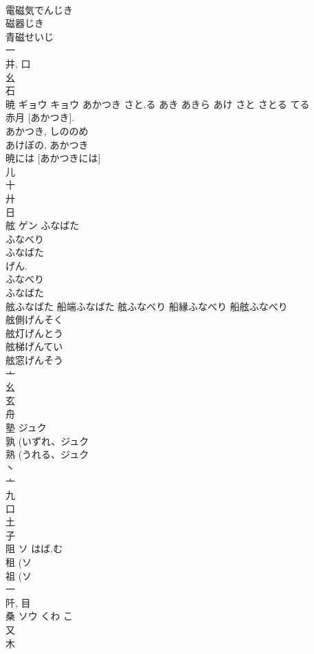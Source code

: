 \documentclass[8pt]{extreport}
\begin{document}
\begin{CJK}{UTF8}{min}
\\	電磁気でんじき 
\\	磁器じき 
\\	青磁せいじ 
\\	一 
\\	并, 口 
\\	幺 
\\	石 
\\	暁	ギョウ キョウ	あかつき さと.る あき あきら あけ さと さとる てる	
\\	赤月 [あかつき]. 
\\	あかつき, しののめ 
\\	あけぼの, あかつき 
\\	暁には [あかつきには] 
\\	儿 
\\	十 
\\	廾 
\\	日 
\\	舷	ゲン	ふなばた	
\\	ふなべり 
\\	ふなばた 
\\	げん. 
\\	ふなべり 
\\	ふなばた 
\\	舷ふなばた 船端ふなばた 舷ふなべり 船縁ふなべり 船舷ふなべり 
\\	舷側げんそく 
\\	舷灯げんとう 
\\	舷梯げんてい 
\\	舷窓げんそう 
\\	亠 
\\	幺 
\\	玄 
\\	舟 
\\	塾	ジュク		
\\	孰 (いずれ、ジュク 
\\	熟 (うれる、ジュク 
\\	丶 
\\	亠 
\\	九 
\\	口 
\\	土 
\\	子 
\\	阻	ソ	はば.む	
\\	租 (ソ 
\\	祖 (ソ 
\\	一 
\\	阡, 目 
\\	桑	ソウ	くわ こ	
\\	又 
\\	木 

\end{CJK}
\end{document}
